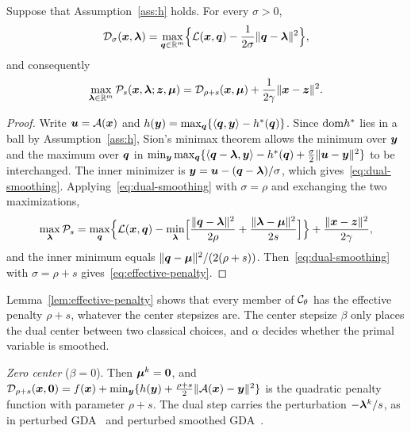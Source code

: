 \begin{lemma}
\label{lem:effective-penalty}
Suppose that Assumption~\ref{ass:h} holds. For every \(\sigma>0\),
\begin{equation}
    \mathcal{D}_\sigma(\bm{x},\bm{\lambda})
    =\max_{\bm{q}\in\mathbb{R}^m}\Bigl\{\mathcal{L}(\bm{x},\bm{q})-\frac{1}{2\sigma}\|\bm{q}-\bm{\lambda}\|^2\Bigr\},
    \label{eq:dual-smoothing}
\end{equation}
and consequently
\begin{equation}
    \max_{\bm{\lambda}\in\mathbb{R}^m}\mathcal P_s(\bm{x},\bm{\lambda};\bm{z},\bm{\mu})
    =\mathcal{D}_{\rho+s}(\bm{x},\bm{\mu})+\frac{1}{2\gamma}\|\bm{x}-\bm{z}\|^2 .
    \label{eq:effective-penalty}
\end{equation}
\end{lemma}

\begin{proof}
Write \(\bm{u}=\mathcal{A}(\bm{x})\) and \(h(\bm{y})=\max_{\bm{q}}\{\langle\bm{q},\bm{y}\rangle-h^*(\bm{q})\}\).
Since \(\mathrm{dom} h^*\) lies in a ball by Assumption~\ref{ass:h}, Sion's minimax
theorem allows the minimum over \(\bm{y}\) and the maximum over \(\bm{q}\) in
\(\min_{\bm{y}}\max_{\bm{q}}\{\langle\bm{q}-\bm{\lambda},\bm{y}\rangle-h^*(\bm{q})
+\frac{\sigma}{2}\|\bm{u}-\bm{y}\|^2\}\) to be interchanged. The inner minimizer is
\(\bm{y}=\bm{u}-(\bm{q}-\bm{\lambda})/\sigma\), which gives~\eqref{eq:dual-smoothing}.
Applying~\eqref{eq:dual-smoothing} with \(\sigma=\rho\) and exchanging the two
maximizations,
\[
    \max_{\bm{\lambda}}\mathcal P_s
    =\max_{\bm{q}}\Bigl\{\mathcal{L}(\bm{x},\bm{q})-\min_{\bm{\lambda}}\Bigl[\frac{\|\bm{q}-\bm{\lambda}\|^2}{2\rho}
    +\frac{\|\bm{\lambda}-\bm{\mu}\|^2}{2s}\Bigr]\Bigr\}+\frac{\|\bm{x}-\bm{z}\|^2}{2\gamma},
\]
and the inner minimum equals \(\|\bm{q}-\bm{\mu}\|^2/(2(\rho+s))\).
Then~\eqref{eq:dual-smoothing} with \(\sigma=\rho+s\)
gives~\eqref{eq:effective-penalty}.
\end{proof}

Lemma~\ref{lem:effective-penalty} shows that every member of
\(\mathcal{C}_\theta\) has the effective penalty \(\rho+s\), whatever the center
stepsizes are. The center stepsize \(\beta\) only places the dual center
between two classical choices, and \(\alpha\) decides whether the primal
variable is smoothed.

\emph{Zero center} (\(\beta=0\)). Then \(\bm{\mu}^k=\bm{0}\), and
\(\mathcal{D}_{\rho+s}(\bm{x},\bm{0})=f(\bm{x})+\min_{\bm{y}}\{h(\bm{y})
+\frac{\rho+s}{2}\|\mathcal{A}(\bm{x})-\bm{y}\|^2\}\) is the quadratic penalty function
with parameter \(\rho+s\). The dual step carries the perturbation
\(-\bm{\lambda}^k/s\), as in perturbed GDA~\cite{lu2020hybrid,xu2023unified} and
perturbed smoothed GDA~\cite{li2026smoothing}.

